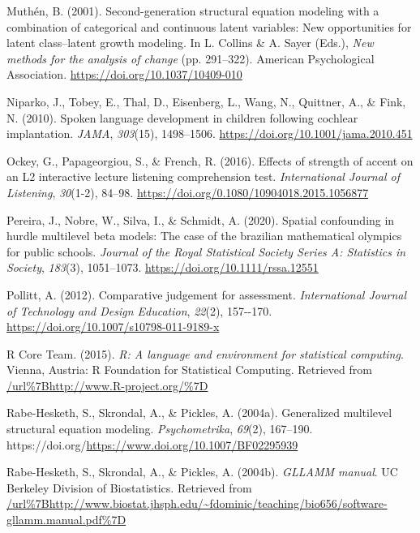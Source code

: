 \documentclass[
]{agujournal2019}
\newlength{\cslhangindent}
\newenvironment{CSLReferences}[2] %
 {\begin{list}{}{%
  \setlength{\itemindent}{0pt}
  \setlength{\leftmargin}{0pt}
  \setlength{\parsep}{0pt}
  \ifodd #1
   \setlength{\leftmargin}{\cslhangindent}
   \setlength{\itemindent}{-1\cslhangindent}
  \fi
  \setlength{\itemsep}{#2\baselineskip}}}
 {\end{list}}
\begin{document}
\begin{CSLReferences}{1}{0}
Muthén, B. (2001). Second-generation structural equation modeling with a
combination of categorical and continuous latent variables: New
opportunities for latent class--latent growth modeling. In L. Collins \&
A. Sayer (Eds.), \emph{New methods for the analysis of change} (pp.
291--322). American Psychological Association.
\url{https://doi.org/10.1037/10409-010}

Niparko, J., Tobey, E., Thal, D., Eisenberg, L., Wang, N., Quittner, A.,
\& Fink, N. (2010). Spoken language development in children following
cochlear implantation. \emph{JAMA}, \emph{303}(15), 1498--1506.
\url{https://doi.org/10.1001/jama.2010.451}

Ockey, G., Papageorgiou, S., \& French, R. (2016). Effects of strength
of accent on an L2 interactive lecture listening comprehension test.
\emph{International Journal of Listening}, \emph{30}(1-2), 84--98.
\url{https://doi.org/0.1080/10904018.2015.1056877}

Pereira, J., Nobre, W., Silva, I., \& Schmidt, A. (2020). Spatial
confounding in hurdle multilevel beta models: The case of the brazilian
mathematical olympics for public schools. \emph{Journal of the Royal
Statistical Society Series A: Statistics in Society}, \emph{183}(3),
1051--1073. \url{https://doi.org/10.1111/rssa.12551}

Pollitt, A. (2012). Comparative judgement for assessment.
\emph{International Journal of Technology and Design Education},
\emph{22}(2), 157-\/-170.
\url{https://doi.org/10.1007/s10798-011-9189-x}

R Core Team. (2015). \emph{R: A language and environment for statistical
computing}. Vienna, Austria: R Foundation for Statistical Computing.
Retrieved from \url{/url\%7Bhttp://www.R-project.org/\%7D}

Rabe-Hesketh, S., Skrondal, A., \& Pickles, A. (2004a). Generalized
multilevel structural equation modeling. \emph{Psychometrika},
\emph{69}(2), 167--190.
https://doi.org/\url{https://www.doi.org/10.1007/BF02295939}

Rabe-Hesketh, S., Skrondal, A., \& Pickles, A. (2004b). \emph{GLLAMM
manual}. UC Berkeley Division of Biostatistics. Retrieved from
\url{/url\%7Bhttp://www.biostat.jhsph.edu/~fdominic/teaching/bio656/software-gllamm.manual.pdf\%7D}


\end{CSLReferences}
\end{document}
